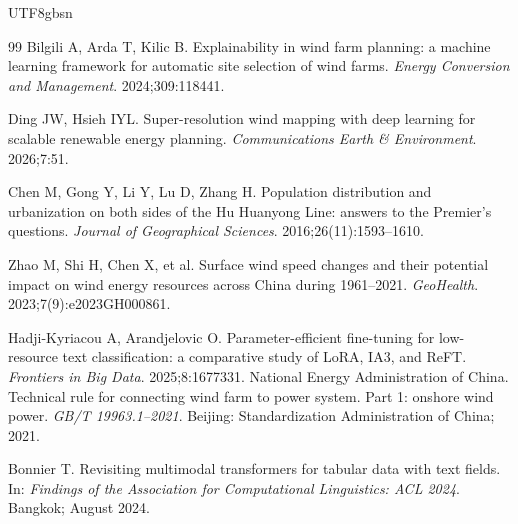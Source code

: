 \documentclass[12pt, a4paper]{article}
\begin{document}
\begin{CJK}{UTF8}{gbsn}
\begin{thebibliography}{99}
Bilgili A, Arda T, Kilic B.
Explainability in wind farm planning: a machine learning
framework for automatic site selection of wind farms.
\textit{Energy Conversion and Management}.
2024;309:118441.

Ding JW, Hsieh IYL.
Super-resolution wind mapping with deep learning for scalable
renewable energy planning.
\textit{Communications Earth \& Environment}.
2026;7:51.


Chen M, Gong Y, Li Y, Lu D, Zhang H.
Population distribution and urbanization on both sides of the
Hu Huanyong Line: answers to the Premier's questions.
\textit{Journal of Geographical Sciences}.
2016;26(11):1593--1610.

Zhao M, Shi H, Chen X, et al.
Surface wind speed changes and their potential impact on wind
energy resources across China during 1961--2021.
\textit{GeoHealth}.
2023;7(9):e2023GH000861.

Hadji-Kyriacou A, Arandjelovic O.
Parameter-efficient fine-tuning for low-resource text
classification: a comparative study of LoRA, IA3, and ReFT.
\textit{Frontiers in Big Data}.
2025;8:1677331.
National Energy Administration of China.
Technical rule for connecting wind farm to power system.
Part 1: onshore wind power.
\textit{GB/T 19963.1--2021}.
Beijing: Standardization Administration of China; 2021.

Bonnier T.
Revisiting multimodal transformers for tabular data with
text fields.
In: \textit{Findings of the Association for Computational
Linguistics: ACL 2024}.
Bangkok; August 2024.

\end{thebibliography}

\end{CJK}
\end{document}
